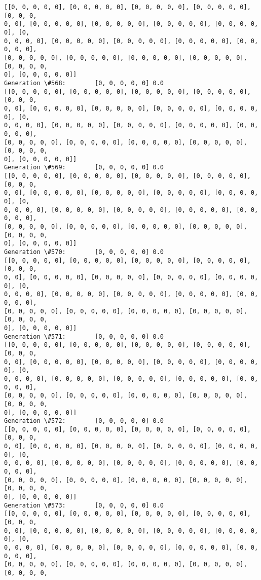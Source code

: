 \documentclass[11pt]{article}
\begin{document}
\begin{Verbatim}[commandchars=\\\{\}]
[[0, 0, 0, 0, 0], [0, 0, 0, 0, 0], [0, 0, 0, 0, 0], [0, 0, 0, 0, 0], [0, 0, 0,
0, 0], [0, 0, 0, 0, 0], [0, 0, 0, 0, 0], [0, 0, 0, 0, 0], [0, 0, 0, 0, 0], [0,
0, 0, 0, 0], [0, 0, 0, 0, 0], [0, 0, 0, 0, 0], [0, 0, 0, 0, 0], [0, 0, 0, 0, 0],
[0, 0, 0, 0, 0], [0, 0, 0, 0, 0], [0, 0, 0, 0, 0], [0, 0, 0, 0, 0], [0, 0, 0, 0,
0], [0, 0, 0, 0, 0]]
Generation \#568:        [0, 0, 0, 0, 0] 0.0
[[0, 0, 0, 0, 0], [0, 0, 0, 0, 0], [0, 0, 0, 0, 0], [0, 0, 0, 0, 0], [0, 0, 0,
0, 0], [0, 0, 0, 0, 0], [0, 0, 0, 0, 0], [0, 0, 0, 0, 0], [0, 0, 0, 0, 0], [0,
0, 0, 0, 0], [0, 0, 0, 0, 0], [0, 0, 0, 0, 0], [0, 0, 0, 0, 0], [0, 0, 0, 0, 0],
[0, 0, 0, 0, 0], [0, 0, 0, 0, 0], [0, 0, 0, 0, 0], [0, 0, 0, 0, 0], [0, 0, 0, 0,
0], [0, 0, 0, 0, 0]]
Generation \#569:        [0, 0, 0, 0, 0] 0.0
[[0, 0, 0, 0, 0], [0, 0, 0, 0, 0], [0, 0, 0, 0, 0], [0, 0, 0, 0, 0], [0, 0, 0,
0, 0], [0, 0, 0, 0, 0], [0, 0, 0, 0, 0], [0, 0, 0, 0, 0], [0, 0, 0, 0, 0], [0,
0, 0, 0, 0], [0, 0, 0, 0, 0], [0, 0, 0, 0, 0], [0, 0, 0, 0, 0], [0, 0, 0, 0, 0],
[0, 0, 0, 0, 0], [0, 0, 0, 0, 0], [0, 0, 0, 0, 0], [0, 0, 0, 0, 0], [0, 0, 0, 0,
0], [0, 0, 0, 0, 0]]
Generation \#570:        [0, 0, 0, 0, 0] 0.0
[[0, 0, 0, 0, 0], [0, 0, 0, 0, 0], [0, 0, 0, 0, 0], [0, 0, 0, 0, 0], [0, 0, 0,
0, 0], [0, 0, 0, 0, 0], [0, 0, 0, 0, 0], [0, 0, 0, 0, 0], [0, 0, 0, 0, 0], [0,
0, 0, 0, 0], [0, 0, 0, 0, 0], [0, 0, 0, 0, 0], [0, 0, 0, 0, 0], [0, 0, 0, 0, 0],
[0, 0, 0, 0, 0], [0, 0, 0, 0, 0], [0, 0, 0, 0, 0], [0, 0, 0, 0, 0], [0, 0, 0, 0,
0], [0, 0, 0, 0, 0]]
Generation \#571:        [0, 0, 0, 0, 0] 0.0
[[0, 0, 0, 0, 0], [0, 0, 0, 0, 0], [0, 0, 0, 0, 0], [0, 0, 0, 0, 0], [0, 0, 0,
0, 0], [0, 0, 0, 0, 0], [0, 0, 0, 0, 0], [0, 0, 0, 0, 0], [0, 0, 0, 0, 0], [0,
0, 0, 0, 0], [0, 0, 0, 0, 0], [0, 0, 0, 0, 0], [0, 0, 0, 0, 0], [0, 0, 0, 0, 0],
[0, 0, 0, 0, 0], [0, 0, 0, 0, 0], [0, 0, 0, 0, 0], [0, 0, 0, 0, 0], [0, 0, 0, 0,
0], [0, 0, 0, 0, 0]]
Generation \#572:        [0, 0, 0, 0, 0] 0.0
[[0, 0, 0, 0, 0], [0, 0, 0, 0, 0], [0, 0, 0, 0, 0], [0, 0, 0, 0, 0], [0, 0, 0,
0, 0], [0, 0, 0, 0, 0], [0, 0, 0, 0, 0], [0, 0, 0, 0, 0], [0, 0, 0, 0, 0], [0,
0, 0, 0, 0], [0, 0, 0, 0, 0], [0, 0, 0, 0, 0], [0, 0, 0, 0, 0], [0, 0, 0, 0, 0],
[0, 0, 0, 0, 0], [0, 0, 0, 0, 0], [0, 0, 0, 0, 0], [0, 0, 0, 0, 0], [0, 0, 0, 0,
0], [0, 0, 0, 0, 0]]
Generation \#573:        [0, 0, 0, 0, 0] 0.0
[[0, 0, 0, 0, 0], [0, 0, 0, 0, 0], [0, 0, 0, 0, 0], [0, 0, 0, 0, 0], [0, 0, 0,
0, 0], [0, 0, 0, 0, 0], [0, 0, 0, 0, 0], [0, 0, 0, 0, 0], [0, 0, 0, 0, 0], [0,
0, 0, 0, 0], [0, 0, 0, 0, 0], [0, 0, 0, 0, 0], [0, 0, 0, 0, 0], [0, 0, 0, 0, 0],
[0, 0, 0, 0, 0], [0, 0, 0, 0, 0], [0, 0, 0, 0, 0], [0, 0, 0, 0, 0], [0, 0, 0, 0,

\end{Verbatim}
\end{document}
